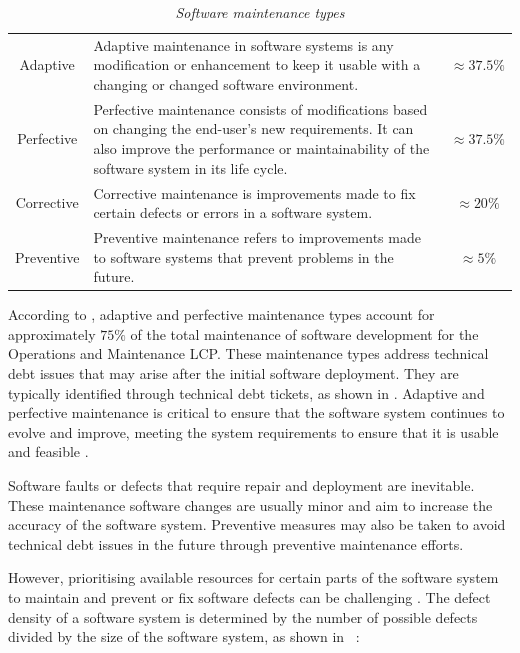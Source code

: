 \begin{table}[!htb]
	\centering
	\caption[Software maintenance types]
	{\textit{Software maintenance types \cite{Ping2010,Hasan2012}}}
	\label{tbl:ch1_maintenanceTypes}
	\begin{tabularx}{\textwidth}{cXc}
		\toprule
		\thead{Maintenance type} & \thead{Description} & \thead{$\%$ of maintenance activities} \\ 
		\midrule

		\rowcolor{lightgray}
		Adaptive & \raggedright Adaptive maintenance in software systems is any modification or enhancement to keep it usable with a changing or changed software environment. & $\approx 37.5\%$ \\ 

		Perfective & \raggedright Perfective maintenance consists of modifications based on changing the end-user's new requirements. It can also improve the performance or maintainability of the software system in its life cycle. & $\approx 37.5\%$ \\ 
		
		\rowcolor{lightgray}
		Corrective & \raggedright Corrective maintenance is improvements made to fix certain defects or errors in a software system. & $\approx 20\%$ \\ 

		\rowcolor{lightgray}
		Preventive & \raggedright  Preventive maintenance refers to improvements made to software systems that prevent problems in the future. & $\approx 5\%$ \\ 
		\bottomrule
	\end{tabularx}
\end{table}

According to , adaptive and perfective maintenance types account for approximately $75\%$ of the total maintenance of software development for the Operations and Maintenance LCP. These maintenance types address technical debt issues that may arise after the initial software deployment. They are typically identified through technical debt tickets, as shown in . Adaptive and perfective maintenance is critical to ensure that the software system continues to evolve and improve, meeting the system requirements to ensure that it is usable and feasible \cite{Kumar2013}.\par Software faults or defects that require repair and deployment are inevitable. These maintenance software changes are usually minor and aim to increase the accuracy of the software system. Preventive measures may also be taken to avoid technical debt issues in the future through preventive maintenance efforts. \par However, prioritising available resources for certain parts of the software system to maintain and prevent or fix software defects can be challenging \cite{Mamone1994, Hasan2012}. The defect density of a software system is determined by the number of possible defects divided by the size of the software system, as shown in ~\cite{Rahmani2010}:


